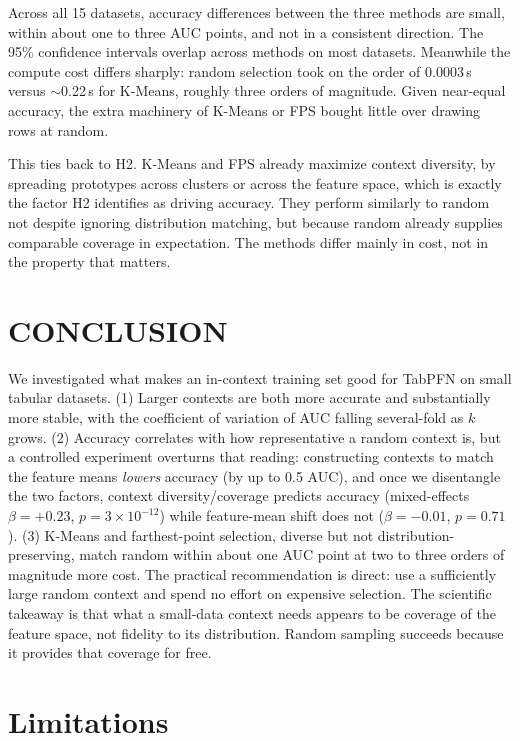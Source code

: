 \documentclass{article}
\begin{document}
Across all 15 datasets, accuracy differences between the three methods are small, within about one to three AUC points, and not in a consistent direction. The 95\% confidence intervals overlap across methods on most datasets. Meanwhile the compute cost differs sharply: random selection took on the order of $0.0003$\,s versus $\sim$0.22\,s for K-Means, roughly three orders of magnitude. Given near-equal accuracy, the extra machinery of K-Means or FPS bought little over drawing rows at random.

This ties back to H2. K-Means and FPS already maximize context diversity, by spreading prototypes across clusters or across the feature space, which is exactly the factor H2 identifies as driving accuracy. They perform similarly to random not despite ignoring distribution matching, but because random already supplies comparable coverage in expectation. The methods differ mainly in cost, not in the property that matters.

\section{CONCLUSION}

We investigated what makes an in-context training set good for TabPFN on small tabular datasets. (1) Larger contexts are both more accurate and substantially more stable, with the coefficient of variation of AUC falling several-fold as $k$ grows. (2) Accuracy correlates with how representative a random context is, but a controlled experiment overturns that reading: constructing contexts to match the feature means \emph{lowers} accuracy (by up to 0.5 AUC), and once we disentangle the two factors, context diversity/coverage predicts accuracy (mixed-effects $\beta=+0.23$, $p=3\times10^{-12}$) while feature-mean shift does not ($\beta=-0.01$, $p=0.71$). (3) K-Means and farthest-point selection, diverse but not distribution-preserving, match random within about one AUC point at two to three orders of magnitude more cost. The practical recommendation is direct: use a sufficiently large random context and spend no effort on expensive selection. The scientific takeaway is that what a small-data context needs appears to be coverage of the feature space, not fidelity to its distribution. Random sampling succeeds because it provides that coverage for free.

\section*{Limitations}
\end{document}
